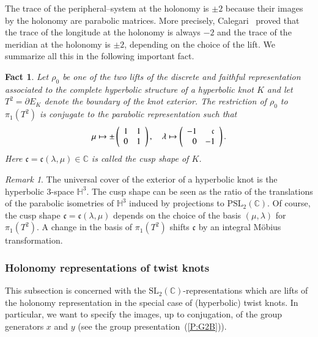 \documentclass[a4paper]{amsart}
\theoremstyle{plain}
\newtheorem{fact}[theorem]{Fact}
\theoremstyle{definition}
\theoremstyle{remark}
\newtheorem{remark}{Remark}%
\newcommand{\C}{{\mathbb C}}
\newcommand{\CC}{{\mathbb C}}
\newcommand{\cusp}{{\mathfrak{c}}}
\newcommand{\SL}{{\mathrm{SL}_2(\C)}}
\begin{document}
    The trace of the peripheral--system at the holonomy is $\pm 2$ because their images by the holonomy are parabolic matrices. More precisely, Calegari~\cite{Calegari} proved that the trace of the longitude at the holonomy is always $-2$ and the trace of the meridian at the holonomy is $\pm 2$, depending on the choice of the lift. 
We summarize all this in the following important fact.

\begin{fact}\label{fact:Calegari}
Let $\rho_0$ be one of the two lifts of the discrete and faithful representation associated to the complete hyperbolic structure of a hyperbolic knot $K$ and let {$T^2 = \partial E_K$} denote the boundary of the knot exterior. The restriction of $\rho_0$ to $\pi_1(T^2)$ is conjugate to the parabolic representation such that
\[
\mu \mapsto 
\pm \left(
    \begin{array}{cc}
      1 & 1 \\
      0 & 1
    \end{array}
    \right), 
\quad 
\lambda \mapsto 
        \left(
        \begin{array}{cc}
          -1 & \hphantom{-}\cusp \\
          \hphantom{-}0 & -1
        \end{array}
        \right).
\]
Here $\cusp = \cusp(\lambda, \mu) \in \CC$ is called the cusp shape of $K$.
\end{fact}

\begin{remark}
The universal cover of the exterior of a hyperbolic knot is the hyperbolic $3$-space $\mathbb{H}^3$. The cusp shape can be seen as the ratio of the translations of the parabolic isometries of $\mathbb{H}^3$ induced by projections to $\mathrm{PSL}_2(\CC)$. Of course, the cusp shape $\cusp = \cusp(\lambda, \mu)$ depends on the choice of the basis $(\mu, \lambda)$ for $\pi_1 (T^2)$. A change in the basis of $\pi_1 (T^2)$ shifts $\cusp$ by an integral M\"obius transformation. 
\end{remark}

\subsubsection{Holonomy representations of twist knots}

This subsection is concerned with the $\SL$-representations which are lifts of the holonomy representation in the special case of (hyperbolic) twist knots. In particular, we want to specify the images, up to conjugation, of the group generators $x$ and $y$ (see the group presentation~(\ref{P:G2B})).
\end{document}
